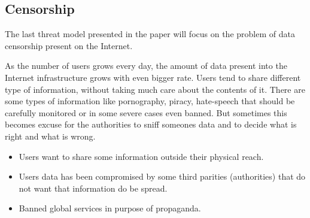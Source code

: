 \subsection{Censorship}
The last threat model presented in the paper will focus on the problem of data censorship present on the Internet.

As the number of users grows every day, the amount of data present into the Internet infrastructure grows with even bigger rate.
Users tend to share different type of information, without taking much care about the contents of it.
There are some types of information like pornography, piracy, hate-speech  that should be carefully monitored or in some severe cases even banned.
But sometimes this becomes excuse for the authorities to sniff someones data and to decide what is right and what is wrong.

\begin{itemize}
  \item Users want to share some information outside their physical reach.
  \item Users data has been compromised by some third parities (authorities) that do not want that information do be spread.
  \item Banned global services in purpose of propaganda.
\end{itemize}
